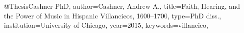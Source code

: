 @Thesis{Cashner-PhD,
author={Cashner, Andrew A.},
title={Faith, Hearing, and the Power of Music
 in Hispanic Villancicos, 1600--1700},
type={PhD diss.},
institution={University of Chicago},
year=2015,
keywords={villancico},
}
